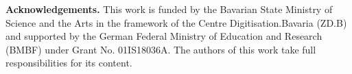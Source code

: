 \documentclass[runningheads]{llncs}\usepackage[]{graphicx}\usepackage[]{color}
\begin{document}
\textbf{Acknowledgements.}
This work is funded by the Bavarian State Ministry of Science and the Arts in the framework of the Centre Digitisation.Bavaria (ZD.B) and supported by the German Federal Ministry of Education and Research (BMBF) under Grant No. 01IS18036A.
The authors of this work take full responsibilities for its content.




\end{document}
